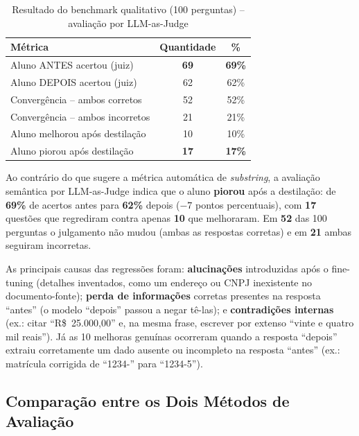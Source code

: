 \documentclass[12pt, a4paper]{article}
\begin{document}
\begin{table}[H]
\centering
\caption{Resultado do benchmark qualitativo (100 perguntas) -- avaliação por LLM-as-Judge}
\label{tab:llm-judge}
\begin{tabular}{lcc}
\toprule
\textbf{Métrica} & \textbf{Quantidade} & \textbf{\%} \\
\midrule
\rowcolor{lightgreen}
Aluno ANTES acertou (juiz)      & \textbf{69} & \textbf{69\%} \\
Aluno DEPOIS acertou (juiz)     & 62 & 62\% \\
\midrule
Convergência -- ambos corretos    & 52 & 52\% \\
Convergência -- ambos incorretos  & 21 & 21\% \\
Aluno melhorou após destilação   & 10 & 10\% \\
\rowcolor{lightred}
Aluno piorou após destilação     & \textbf{17} & \textbf{17\%} \\
\bottomrule
\end{tabular}
\end{table}

\begin{warningbox}
Ao contrário do que sugere a métrica automática de \textit{substring}, a avaliação
semântica por LLM-as-Judge indica que o aluno \textbf{piorou} após a destilação:
de \textbf{69\%} de acertos antes para \textbf{62\%} depois ($-7$ pontos percentuais),
com \textbf{17} questões que regrediram contra apenas \textbf{10} que melhoraram.
Em \textbf{52} das 100 perguntas o julgamento não mudou (ambas as respostas corretas)
e em \textbf{21} ambas seguiram incorretas.
\end{warningbox}

As principais causas das regressões foram: \textbf{alucinações} introduzidas após o
fine-tuning (detalhes inventados, como um endereço ou CNPJ inexistente no
documento-fonte); \textbf{perda de informações} corretas presentes na resposta
``antes'' (o modelo ``depois'' passou a negar tê-las); e \textbf{contradições
internas} (ex.: citar ``R\$~25.000,00'' e, na mesma frase, escrever por extenso
``vinte e quatro mil reais''). Já as 10 melhoras genuínas ocorreram quando a resposta
``depois'' extraiu corretamente um dado ausente ou incompleto na resposta ``antes''
(ex.: matrícula corrigida de ``1234-'' para ``1234-5'').

\subsection{Comparação entre os Dois Métodos de Avaliação}
\end{document}
